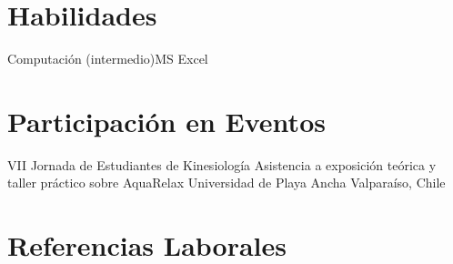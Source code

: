 \documentclass[11pt,a4paper,sans]{moderncv}
\begin{document}
\section{Habilidades}
           {Computación (intermedio)}{MS Excel}

\section{Participación en Eventos}

        {VII Jornada de Estudiantes de Kinesiología}
        {Asistencia a exposición teórica y taller práctico sobre AquaRelax}
        {Universidad de Playa Ancha}
        {Valparaíso, Chile}
        {}
        
\section{Referencias Laborales}

\end{document}

